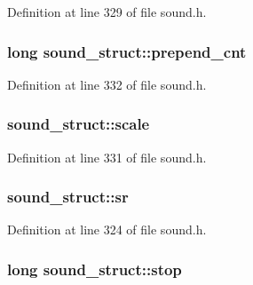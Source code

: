 Definition at line 329 of file sound.\+h.

\subsubsection[{\texorpdfstring{prepend\+\_\+cnt}{prepend_cnt}}]{\setlength{\rightskip}{0pt plus 5cm}long sound\+\_\+struct\+::prepend\+\_\+cnt}\hypertarget{structsound__struct_a253c4a0814605d956f3fccb616ccbe90}{}\label{structsound__struct_a253c4a0814605d956f3fccb616ccbe90}


Definition at line 332 of file sound.\+h.

\subsubsection[{\texorpdfstring{scale}{scale}}]{ sound\+\_\+struct\+::scale}\hypertarget{structsound__struct_a7531e5d5bc141fa994e5d787bb2dea01}{}\label{structsound__struct_a7531e5d5bc141fa994e5d787bb2dea01}


Definition at line 331 of file sound.\+h.

\subsubsection[{\texorpdfstring{sr}{sr}}]{ sound\+\_\+struct\+::sr}\hypertarget{structsound__struct_aafecd01e13520f7fb83fe8e2ac2cd026}{}\label{structsound__struct_aafecd01e13520f7fb83fe8e2ac2cd026}


Definition at line 324 of file sound.\+h.

\subsubsection[{\texorpdfstring{stop}{stop}}]{\setlength{\rightskip}{0pt plus 5cm}long sound\+\_\+struct\+::stop}\hypertarget{structsound__struct_a95baf30b19741f4b7115900fb648c716}{}\label{structsound__struct_a95baf30b19741f4b7115900fb648c716}


